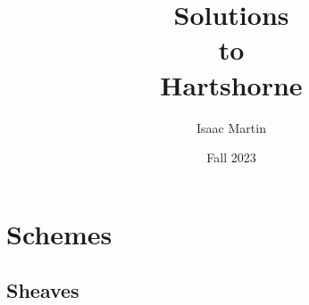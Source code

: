 

\title[Solutions to \emph{Algebraic Geometry} by Robin Hartshorne]{\setlength{\parindent}{0pt}Solutions \\to \\Hartshorne} %
\author{Isaac Martin} %
\date{Fall 2023}



\maketitle
\tableofcontents %





\setcounter{chapter}{1}
\chapter{Schemes}
\section{Sheaves}

